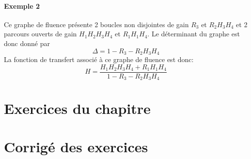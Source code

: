 \paragraph{Exemple 2}

\begin{center}
\end{center}
Ce graphe de fluence présente 2 boucles non disjointes de gain $R_3$ et $R_2H_3H_4$ 
et 2 parcours ouverts de gain $H_1H_2H_3H_4$ et $R_1H_1H_4$.
Le déterminant du graphe est donc donné par 
$$
\Delta=1-R_3-R_2H_3H_4
$$
La fonction de transfert associé à ce graphe de fluence est donc:
$$
H=\dfrac{H_1H_2H_3H_4+R_1H_1H_4}{1-R_3-R_2H_3H_4}
$$

\newpage
\section*{Exercices du chapitre}


\exercice{}
\question

\newpage
\section*{Corrigé des exercices}


